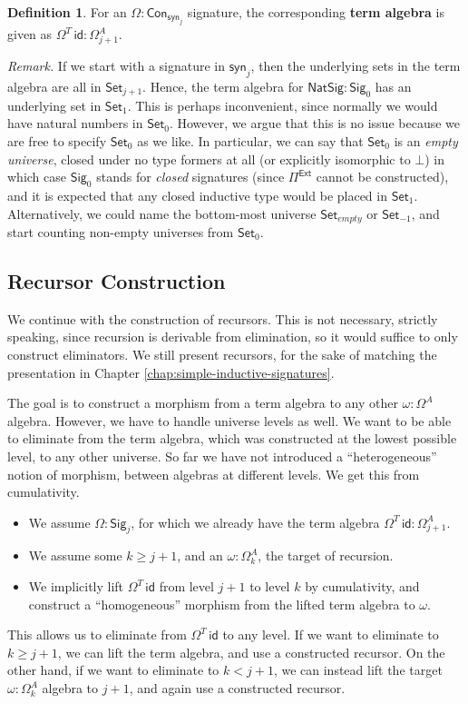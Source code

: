 \documentclass[12pt,a4paper,twoside,openany]{book}
\theoremstyle{remark}
\theoremstyle{definition}
\newtheorem{mydefinition}{Definition}
\theoremstyle{theorem}
\newcommand{\id}{\mathsf{id}}
\newcommand{\Con}{\mathsf{Con}}
\newcommand{\Set}{\mathsf{Set}}
\newcommand{\Pie}{\Pi^{\mathsf{Ext}}}
\newcommand{\Sig}{\mathsf{Sig}}
\newcommand{\NatSig}{\mathsf{NatSig}}
\newcommand{\syn}{\mathsf{syn}}
\begin{document}
\begin{mydefinition}
For an $\Omega : \Con_{\syn_j}$ signature, the corresponding \textbf{term
algebra} is given as $\Omega^T\,\id : \Omega^A_{j+1}$.
\end{mydefinition}

\emph{Remark.} If we start with a signature in $\syn_j$, then the underlying
sets in the term algebra are all in $\Set_{j+1}$. Hence, the term algebra for
$\NatSig : \Sig_0$ has an underlying set in $\Set_1$. This is perhaps
inconvenient, since normally we would have natural numbers in $\Set_0$. However,
we argue that this is no issue because we are free to specify $\Set_0$ as we
like. In particular, we can say that $\Set_0$ is an \emph{empty universe},
closed under no type formers at all (or explicitly isomorphic to $\bot$) in
which case $\Sig_0$ stands for \emph{closed} signatures (since $\Pie$ cannot be
constructed), and it is expected that any closed inductive type would be placed
in $\Set_1$. Alternatively, we could name the bottom-most universe
$\Set_{empty}$ or $\Set_{-1}$, and start counting non-empty universes from
$\Set_0$.

\subsection{Recursor Construction}

We continue with the construction of recursors. This is not necessary, strictly
speaking, since recursion is derivable from elimination, so it would suffice to
only construct eliminators. We still present recursors, for the sake of matching
the presentation in Chapter \ref{chap:simple-inductive-signatures}.

The goal is to construct a morphism from a term algebra to any other $\omega :
\Omega^A$ algebra. However, we have to handle universe levels as well. We want
to be able to eliminate from the term algebra, which was constructed at the
lowest possible level, to any other universe. So far we have not introduced a
``heterogeneous'' notion of morphism, between algebras at different levels. We
get this from cumulativity.
\begin{itemize}
  \item We assume $\Omega : \Sig_j$, for which we already have the term algebra $\Omega^T\,\id : \Omega^A_{j+1}$.
  \item We assume some $k \geq j + 1$, and an $\omega : \Omega^A_{k}$, the target of recursion.
  \item We implicitly lift $\Omega^T\,\id$ from level $j + 1$ to level $k$ by cumulativity, and construct
        a ``homogeneous'' morphism from the lifted term algebra to $\omega$.
\end{itemize}
This allows us to eliminate from $\Omega^T\,\id$ to any level. If we want to
eliminate to $k \geq j + 1$, we can lift the term algebra, and use a constructed
recursor. On the other hand, if we want to eliminate to $k < j + 1$, we can
instead lift the target $\omega : \Omega^A_{k}$ algebra to $j + 1$, and again
use a constructed recursor.
\end{document}
